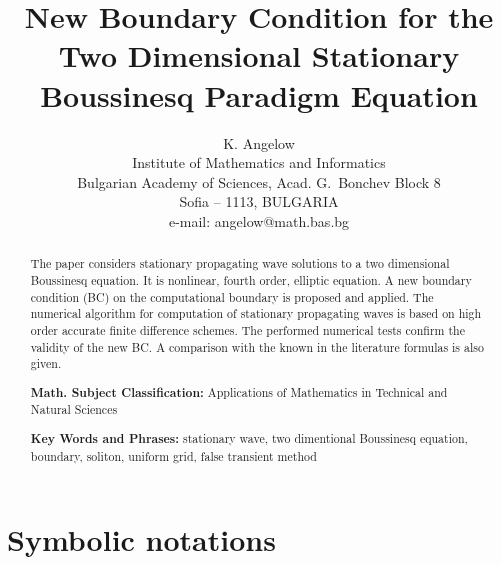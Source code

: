 \documentclass[12pt]{article}
\theoremstyle{theorem}
\theoremstyle{defi}
\begin{document}

\title{New Boundary Condition for the Two Dimensional Stationary Boussinesq Paradigm Equation}

\author{K. Angelow  \\[6pt]
Institute of Mathematics and Informatics\\
Bulgarian Academy of Sciences, Acad. G.~Bonchev Block 8\\
Sofia -- 1113, BULGARIA\\
e-mail: angelow@math.bas.bg\\[6pt] }

\maketitle

\begin{abstract}

The paper considers stationary propagating wave solutions to a two dimensional Boussinesq equation. It is nonlinear, fourth order, elliptic equation. A new boundary condition (BC) on the computational boundary is proposed and applied. The numerical algorithm for computation of stationary propagating waves is based on high order accurate finite difference schemes. The performed numerical tests confirm the validity of the new BC. A comparison with the known in the literature formulas is also given.

\medskip

{\bf Math. Subject Classification:} Applications of Mathematics in Technical and Natural Sciences

{\bf Key Words and Phrases:} stationary wave, two dimentional Boussinesq equation, boundary, soliton, uniform grid, false transient method

\end{abstract}

\section{Symbolic notations}
\end{document}
